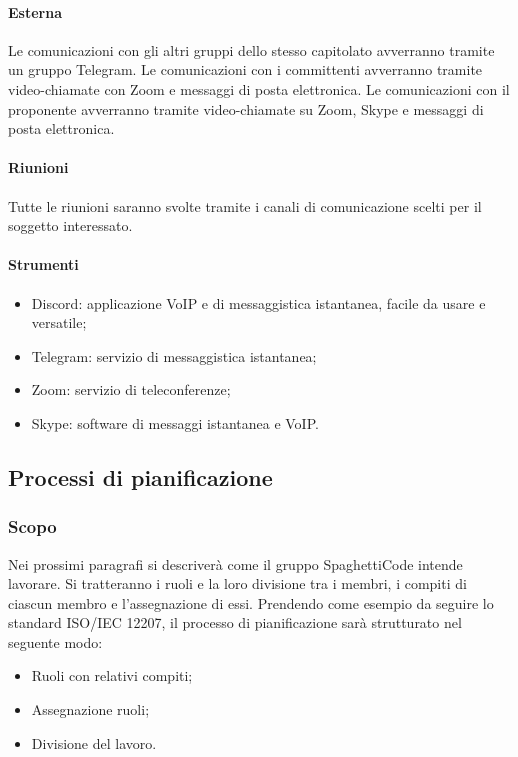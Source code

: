 \documentclass[../norme-di-progetto.tex]{subfiles}
\begin{document}
        \paragraph{Esterna}
        Le comunicazioni con gli altri gruppi dello stesso capitolato avverranno tramite un gruppo Telegram.
        Le comunicazioni con i committenti avverranno tramite video-chiamate con Zoom e messaggi di posta elettronica.
        Le comunicazioni con il proponente avverranno tramite video-chiamate su Zoom, Skype e messaggi di posta elettronica.
        \paragraph{Riunioni}
        Tutte le riunioni saranno svolte tramite i canali di comunicazione scelti per il soggetto interessato. 
        \paragraph{Strumenti}
        \begin{itemize}
            \item Discord: applicazione VoIP e di messaggistica istantanea, facile da usare e versatile;
            \item Telegram: servizio di messaggistica istantanea;
            \item Zoom: servizio di teleconferenze;
            \item Skype: software di messaggi istantanea e VoIP.
        \end{itemize}

\subsection{Processi di pianificazione}
    \subsubsection{Scopo}
    Nei prossimi paragrafi si descriverà come il gruppo SpaghettiCode intende lavorare. Si tratteranno i ruoli e la loro divisione tra i membri, i compiti di ciascun membro e l'assegnazione di essi. Prendendo come esempio da seguire lo standard ISO/IEC 12207, il processo di pianificazione sarà strutturato nel seguente modo:
    \begin{itemize}
        \item Ruoli con relativi compiti;
        \item Assegnazione ruoli;
        \item Divisione del lavoro.
    \end{itemize}
\end{document}
